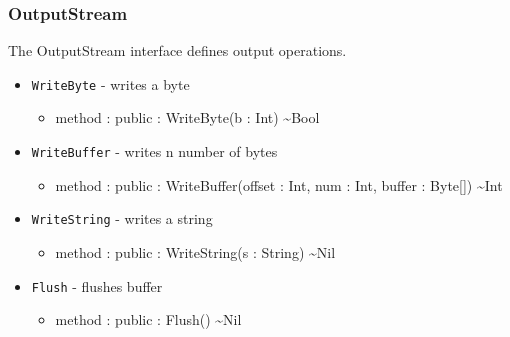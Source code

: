 \documentclass[11pt]{article}
\begin{document}
\subsubsection{OutputStream}
The OutputStream interface defines output operations.
\begin{itemize}
\item \texttt{WriteByte} - writes a byte
  \begin{itemize}
  \item method : public : WriteByte(b : Int) \textasciitilde Bool
  \end{itemize}
\item \texttt{WriteBuffer} - writes n number of bytes
  \begin{itemize}
  \item method : public : WriteBuffer(offset : Int, num : Int, buffer
    : Byte[]) \textasciitilde Int
  \end{itemize}
\item \texttt{WriteString} - writes a string
  \begin{itemize}
  \item method : public : WriteString(s : String) \textasciitilde Nil
  \end{itemize}
\item \texttt{Flush} - flushes buffer
  \begin{itemize}
  \item method : public : Flush() \textasciitilde Nil
  \end{itemize}
\end{itemize}
\end{document}
